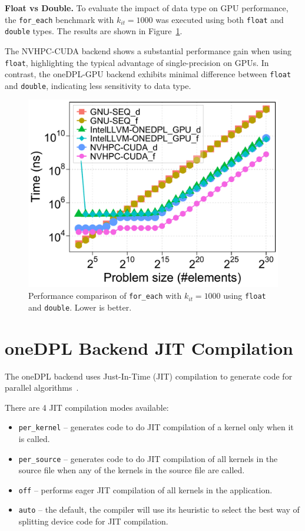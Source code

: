 \documentclass[sigconf]{acmart}
\newcommand{\mypar}[1]{{\bf #1.}}
\begin{document}
\mypar{Float vs Double}
To evaluate the impact of data type on GPU performance, the \texttt{for\_each}
benchmark with $k_{it} = 1000$ was executed using both \texttt{float} and
\texttt{double} types. The results are shown in
Figure~\ref{fig:gpu_float_vs_double}.

The NVHPC-CUDA backend shows a substantial performance gain when using
\texttt{float}, highlighting the typical advantage of single-precision on GPUs.
In contrast, the oneDPL-GPU backend exhibits minimal difference between
\texttt{float} and \texttt{double}, indicating less sensitivity to data type.

\begin{figure}[H]
      \centering
      \includegraphics[width=\linewidth]{figures/problemSize_time_gpu-FvsD-for_each-k1000}
      \caption{Performance comparison of \texttt{for\_each} with $k_{it} = 1000$
            using \texttt{float} and \texttt{double}. Lower is better.}
      \label{fig:gpu_float_vs_double}
\end{figure}

\section{oneDPL Backend JIT Compilation}
The oneDPL backend uses Just-In-Time (JIT) compilation to generate code for
parallel algorithms~\cite{onedpl:jit}.

There are 4 JIT compilation modes available:
\begin{itemize}
      \item \texttt{per\_kernel} – generates code to do JIT compilation of a kernel only when it is called.
      \item \texttt{per\_source} – generates code to do JIT compilation of all kernels in the source file when any of the kernels in the source file are called.
      \item \texttt{off} – performs eager JIT compilation of all kernels in the application.
      \item \texttt{auto} – the default, the compiler will use its heuristic to select the best way of splitting device code for JIT compilation.
\end{itemize}
\end{document}
